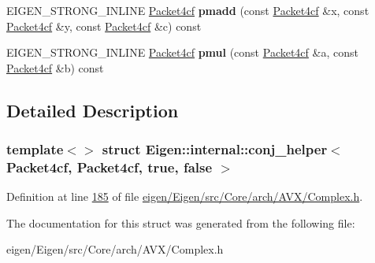 \begin{DoxyCompactItemize}
E\+I\+G\+E\+N\+\_\+\+S\+T\+R\+O\+N\+G\+\_\+\+I\+N\+L\+I\+NE \hyperlink{struct_eigen_1_1internal_1_1_packet4cf}{Packet4cf} {\bfseries pmadd} (const \hyperlink{struct_eigen_1_1internal_1_1_packet4cf}{Packet4cf} \&x, const \hyperlink{struct_eigen_1_1internal_1_1_packet4cf}{Packet4cf} \&y, const \hyperlink{struct_eigen_1_1internal_1_1_packet4cf}{Packet4cf} \&c) const
\item 
\mbox{\label{struct_eigen_1_1internal_1_1conj__helper_3_01_packet4cf_00_01_packet4cf_00_01true_00_01false_01_4_a18cb647e7118b87040773cb6ba846076}} 
E\+I\+G\+E\+N\+\_\+\+S\+T\+R\+O\+N\+G\+\_\+\+I\+N\+L\+I\+NE \hyperlink{struct_eigen_1_1internal_1_1_packet4cf}{Packet4cf} {\bfseries pmul} (const \hyperlink{struct_eigen_1_1internal_1_1_packet4cf}{Packet4cf} \&a, const \hyperlink{struct_eigen_1_1internal_1_1_packet4cf}{Packet4cf} \&b) const
\end{DoxyCompactItemize}


\subsection{Detailed Description}
\subsubsection*{template$<$$>$\newline
struct Eigen\+::internal\+::conj\+\_\+helper$<$ Packet4cf, Packet4cf, true, false $>$}



Definition at line \hyperlink{eigen_2_eigen_2src_2_core_2arch_2_a_v_x_2_complex_8h_source_l00185}{185} of file \hyperlink{eigen_2_eigen_2src_2_core_2arch_2_a_v_x_2_complex_8h_source}{eigen/\+Eigen/src/\+Core/arch/\+A\+V\+X/\+Complex.\+h}.



The documentation for this struct was generated from the following file\+:\begin{DoxyCompactItemize}
\item 
eigen/\+Eigen/src/\+Core/arch/\+A\+V\+X/\+Complex.\+h\end{DoxyCompactItemize}
